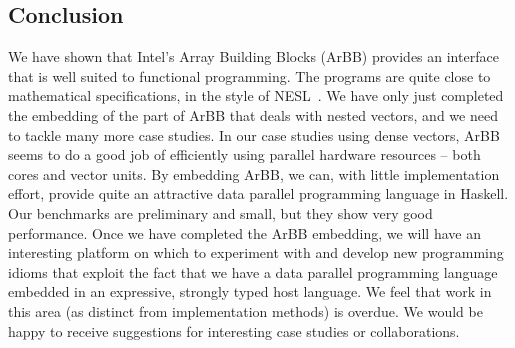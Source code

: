 \subsection{Conclusion} 
We have shown that Intel's Array Building Blocks (ArBB) provides
an interface that is well suited to functional programming. 
The programs are quite close to mathematical specifications, in the style of NESL~. We have only just completed the embedding of the part of ArBB that deals with nested vectors, and we need to tackle many more case studies.
In our case studies using dense vectors, ArBB seems to do a good job of efficiently using parallel
hardware resources -- both cores and vector units.
By
embedding ArBB, we can, with little implementation effort, provide
quite an attractive data parallel programming language in Haskell.
Our benchmarks are preliminary and small, but they show very good performance.
Once we have completed the ArBB embedding, we will have an interesting platform on which to
experiment with and develop new programming idioms that exploit the fact
that we have a data parallel programming language embedded in an
expressive, strongly typed host language.
We feel that work in this area (as distinct from implementation methods)
is overdue. We would be happy to receive suggestions
for interesting case studies or collaborations.


